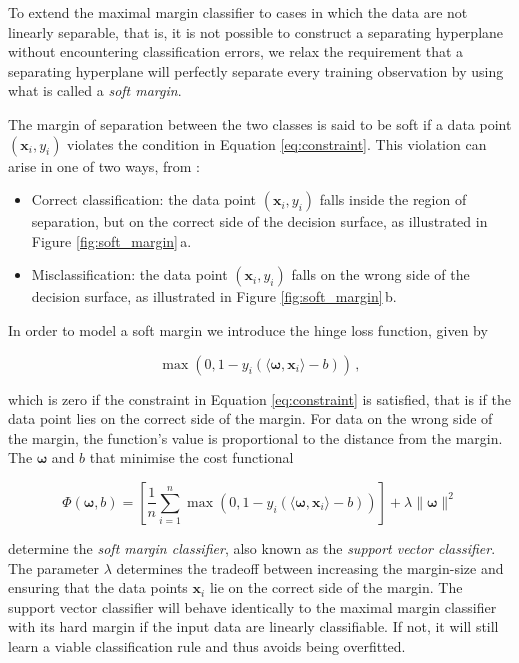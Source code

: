 To extend the maximal margin classifier to cases in which the data are not linearly separable, that is, it is not possible to construct a separating hyperplane without encountering classification errors, we relax the requirement that a separating hyperplane will perfectly separate every training observation by using what is called a \emph{soft margin}.


\noindent
The margin of separation between the two classes is said to be soft if a data point $(\bm{x}_i, y_i)$ violates the condition in Equation \ref{eq:constraint}. This violation can arise in one of two ways, from \cite{haykin2009neural}:

\begin{itemize}

\item Correct classification: the data point  $(\bm{x}_i, y_i)$ falls inside the region of separation, but on the correct side of the decision surface, as illustrated in Figure \ref{fig:soft_margin}\,a.

\item Misclassification: the data point $(\bm{x}_i, y_i)$ falls on the wrong side of the decision surface, as illustrated in Figure \ref{fig:soft_margin}\,b.

\end{itemize}


In order to model a soft margin we introduce the hinge loss function, given by

\begin{equation}
\max\left(0, 1 - y_i (\langle \bm{\omega} , \bm{x}_i \rangle - b) \right)\,,
\end{equation}

\noindent
which is zero if the constraint in Equation \ref{eq:constraint} is satisfied, that is if the data point lies on the correct side of the margin. For data on the wrong side of the margin, the function's value is proportional to the distance from the margin. The $\bm{\omega}$ and $b$ that minimise the cost functional

\begin{equation}
\Phi(\bm{\omega}, b) = \left[\frac{1}{n} \sum_{i=1}^n \max\left(0, 1 - y_i (\langle \bm{\omega} , \bm{x}_i \rangle - b) \right)\right] + \lambda \|\bm{\omega}\|^2
\label{eq:soft_marg}
\end{equation}

\noindent
determine the \emph{soft margin classifier}, also known as the \emph{support vector classifier}. The parameter $\lambda$ determines the tradeoff between increasing the margin-size and ensuring that the data points $\bm{x}_i$ lie on the correct side of the margin. The support vector classifier will behave identically to the maximal margin classifier with its hard margin if the input data are linearly classifiable. If not, it will still learn a viable classification rule and thus avoids being overfitted.


